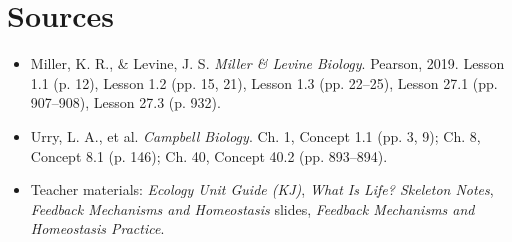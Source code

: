 \documentclass[11pt,letterpaper]{article}
\begin{document}
\section{Sources}

\begin{itemize}
  \item Miller, K. R., \& Levine, J. S. \emph{Miller \& Levine Biology}. Pearson, 2019. Lesson 1.1 (p. 12), Lesson 1.2 (pp. 15, 21), Lesson 1.3 (pp. 22–25), Lesson 27.1 (pp. 907–908), Lesson 27.3 (p. 932).
  \item Urry, L. A., et al. \emph{Campbell Biology}. Ch. 1, Concept 1.1 (pp. 3, 9); Ch. 8, Concept 8.1 (p. 146); Ch. 40, Concept 40.2 (pp. 893–894).
  \item Teacher materials: \emph{Ecology Unit Guide (KJ)}, \emph{What Is Life? Skeleton Notes}, \emph{Feedback Mechanisms and Homeostasis} slides, \emph{Feedback Mechanisms and Homeostasis Practice}.
\end{itemize}
\end{document}
